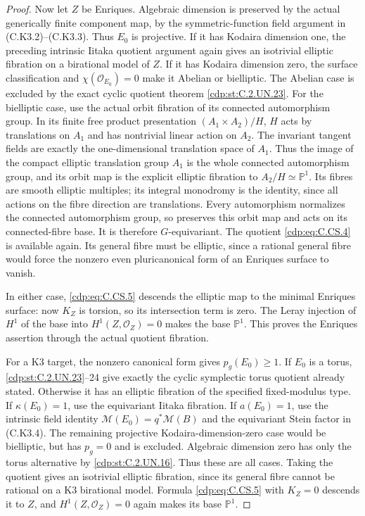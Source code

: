 \begin{proof}
Now let $Z$ be Enriques. Algebraic
dimension is preserved by the actual
generically finite component map, by
the symmetric-function field argument
in (C.K3.2)--(C.K3.3). Thus $E_0$ is
projective. If it has Kodaira dimension
one, the preceding intrinsic Iitaka
quotient argument again gives an
isotrivial elliptic fibration on a
birational model of $Z$. If it has
Kodaira dimension zero, the surface
classification and $\chi(\mathcal O_{E_0})=0$
make it Abelian or bielliptic.
The Abelian case is excluded by the
exact cyclic quotient theorem \ref{cdp:st:C.2.UN.23}.
For the bielliptic case, use the actual
orbit fibration of its connected
automorphism group. In its finite free
product presentation $(A_1\times A_2)/H$,
$H$ acts by translations on $A_1$ and
has nontrivial linear action on $A_2$.
The invariant tangent fields are exactly
the one-dimensional translation space
of $A_1$. Thus the image of the compact
elliptic translation group $A_1$ is
the whole connected automorphism group,
and its orbit map is the explicit
elliptic fibration to $A_2/H\simeq\mathbb P^1$.
Its fibres are smooth elliptic multiples;
its integral monodromy is the identity,
since all actions on the fibre direction
are translations. Every automorphism
normalizes the connected automorphism
group, so preserves this orbit map and
acts on its connected-fibre base. It
is therefore $G$-equivariant. The quotient
\eqref{cdp:eq:C.CS.4} is available again. Its
general fibre must be elliptic, since
a rational general fibre would force
the nonzero even pluricanonical form
of an Enriques surface to vanish.

In either case, \eqref{cdp:eq:C.CS.5} descends the
elliptic map to the minimal Enriques
surface: now $K_Z$ is torsion, so its
intersection term is zero. The Leray
injection of $H^1$ of the base into
$H^1(Z,\mathcal O_Z)=0$ makes the
base $\mathbb P^1$. This proves the
Enriques assertion through the actual
quotient fibration.

For a K3 target, the nonzero canonical
form gives $p_g(E_0)\ge1$. If $E_0$
is a torus, \ref{cdp:st:C.2.UN.23}--24 give exactly
the cyclic symplectic torus quotient
already stated. Otherwise it has an
elliptic fibration of the specified
fixed-modulus type. If $\kappa(E_0)=1$,
use the equivariant Iitaka fibration.
If $a(E_0)=1$, use the intrinsic
field identity $\mathcal M(E_0)=q^*\mathcal M(B)$
and the equivariant Stein factor in
(C.K3.4). The remaining projective
Kodaira-dimension-zero case would be
bielliptic, but has $p_g=0$ and is
excluded. Algebraic dimension zero
has only the torus alternative by
\ref{cdp:st:C.2.UN.16}. Thus these are all cases.
Taking the quotient gives an isotrivial
elliptic fibration, since its general
fibre cannot be rational on a K3
birational model. Formula \eqref{cdp:eq:C.CS.5}
with $K_Z=0$ descends it to $Z$,
and $H^1(Z,\mathcal O_Z)=0$ again
makes its base $\mathbb P^1$.


\end{proof}
